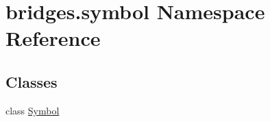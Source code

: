 \hypertarget{namespacebridges_1_1symbol}{}\section{bridges.\+symbol Namespace Reference}
\label{namespacebridges_1_1symbol}
\subsection*{Classes}
\begin{DoxyCompactItemize}
\item 
class \mbox{\hyperlink{classbridges_1_1symbol_1_1_symbol}{Symbol}}
\end{DoxyCompactItemize}
